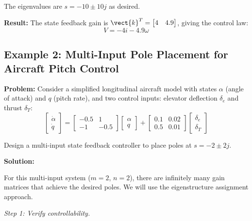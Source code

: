 The eigenvalues are $s = -10 \pm 10j$ as desired.

\textbf{Result:} The state feedback gain is $\vect{k}^T = \begin{bmatrix} 4 & 4.9 \end{bmatrix}$, giving the control law:
\begin{equation}
V = -4i - 4.9\omega
\end{equation}

\subsection{Example 2: Multi-Input Pole Placement for Aircraft Pitch Control}

\textbf{Problem:} Consider a simplified longitudinal aircraft model with states $\alpha$ (angle of attack) and $q$ (pitch rate), and two control inputs: elevator deflection $\delta_e$ and thrust $\delta_T$:
\begin{equation}
\begin{bmatrix} \dot{\alpha} \\ \dot{q} \end{bmatrix} =
\begin{bmatrix} -0.5 & 1 \\ -1 & -0.5 \end{bmatrix}
\begin{bmatrix} \alpha \\ q \end{bmatrix} +
\begin{bmatrix} 0.1 & 0.02 \\ 0.5 & 0.01 \end{bmatrix}
\begin{bmatrix} \delta_e \\ \delta_T \end{bmatrix}
\end{equation}

Design a multi-input state feedback controller to place poles at $s = -2 \pm 2j$.

\textbf{Solution:}

For this multi-input system ($m = 2$, $n = 2$), there are infinitely many gain matrices that achieve the desired poles. We will use the eigenstructure assignment approach.

\textit{Step 1: Verify controllability.}

